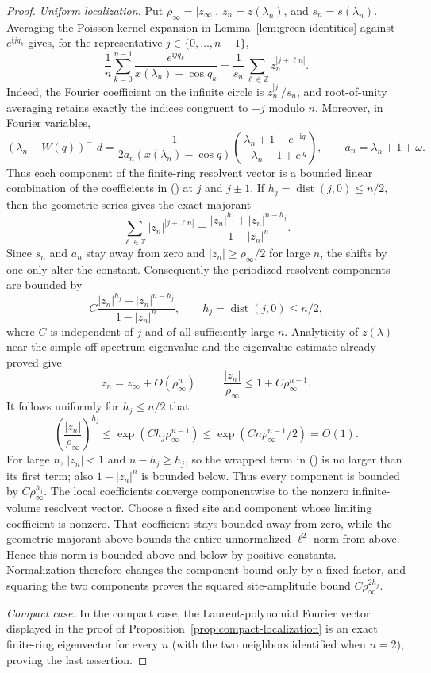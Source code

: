 \documentclass[twoside,10pt]{article}
\numberwithin{equation}{section}
\theoremstyle{slbody}
\theoremstyle{definition}
\theoremstyle{remark}
\newcommand{\Z}{\mathbb Z}
\newcommand{\ii}{\mathrm i}
\renewcommand{\eqref}[1]{%
  \textup{{\normalfont(\oldstylenums{\ref{#1}}}\normalfont)}}
\begin{document}
\begin{proof}
\smallskip
\noindent\emph{Uniform localization.}
Put $\rho_\infty=|z_\infty|$, $z_n=z(\lambda_n)$, and
$s_n=s(\lambda_n)$.  Averaging the Poisson-kernel expansion in
Lemma~\ref{lem:green-identities} against $e^{\ii jq_k}$ gives, for
the representative $j\in\{0,\ldots,n-1\}$,
\begin{equation}\label{eq:localized-aliased-coefficient}
 \frac1n\sum_{k=0}^{n-1}
   \frac{e^{\ii jq_k}}{x(\lambda_n)-\cos q_k}
 =\frac1{s_n}\sum_{\ell\in\Z}z_n^{|j+\ell n|}.
\end{equation}
Indeed, the Fourier coefficient on the infinite circle is
$z_n^{|j|}/s_n$, and root-of-unity averaging retains exactly the
indices congruent to $-j$ modulo $n$.  Moreover, in Fourier variables,
\[
 (\lambda_n-W(q))^{-1}d
 =\frac1{2a_n(x(\lambda_n)-\cos q)}
   \binom{\lambda_n+1-e^{-\ii q}}
         {-\lambda_n-1+e^{\ii q}},
 \qquad a_n=\lambda_n+1+\omega.
\]
Thus each component of the finite-ring resolvent vector is a bounded
linear combination of the coefficients in
\eqref{eq:localized-aliased-coefficient} at $j$ and $j\pm1$.  If
$h_j=\operatorname{dist}(j,0)\le n/2$, then the geometric series gives
the exact majorant
\[
 \sum_{\ell\in\Z}|z_n|^{|j+\ell n|}
 =\frac{|z_n|^{h_j}+|z_n|^{n-h_j}}{1-|z_n|^n}.
\]
Since $s_n$ and $a_n$ stay away from zero and
$|z_n|\ge\rho_\infty/2$ for
large $n$, the shifts by one only alter the constant.  Consequently
the periodized resolvent components are bounded by
\begin{equation}\label{eq:localized-periodization-bound}
 C\frac{|z_n|^{h_j}+|z_n|^{n-h_j}}{1-|z_n|^n},
 \qquad h_j=\operatorname{dist}(j,0)\le n/2,
\end{equation}
where $C$ is independent of $j$ and of all sufficiently large $n$.
Analyticity of $z(\lambda)$ near the simple off-spectrum eigenvalue and
the eigenvalue estimate already proved give
\[
 z_n=z_\infty+O(\rho_\infty^n),\qquad
 \frac{|z_n|}{\rho_\infty}\le1+C\rho_\infty^{n-1}.
\]
It follows uniformly for $h_j\le n/2$ that
\[
 \left(\frac{|z_n|}{\rho_\infty}\right)^{h_j}
 \le \exp(Ch_j\rho_\infty^{n-1})
 \le \exp(Cn\rho_\infty^{n-1}/2)=O(1).
\]
For large $n$, $|z_n|<1$ and $n-h_j\ge h_j$, so the wrapped term in
\eqref{eq:localized-periodization-bound} is no larger than its first
term; also $1-|z_n|^n$ is bounded below.  Thus every component is
bounded by $C\rho_\infty^{h_j}$.  The local coefficients converge
componentwise to the nonzero infinite-volume resolvent vector.  Choose a
fixed site and component whose limiting coefficient is nonzero.  That
coefficient stays bounded away from zero, while the geometric majorant above
bounds the entire unnormalized $\ell^2$ norm from above.  Hence this norm is
bounded above and below by positive constants.  Normalization therefore
changes the component bound only by a fixed factor, and squaring the two
components proves the squared site-amplitude bound
$C\rho_\infty^{2h_j}$.

\smallskip
\noindent\emph{Compact case.}
In the compact case, the Laurent-polynomial Fourier vector displayed in
the proof of Proposition~\ref{prop:compact-localization} is an exact finite-ring
eigenvector for every $n$ (with the two neighbors identified when
$n=2$), proving the last assertion.
\end{proof}
\end{document}
